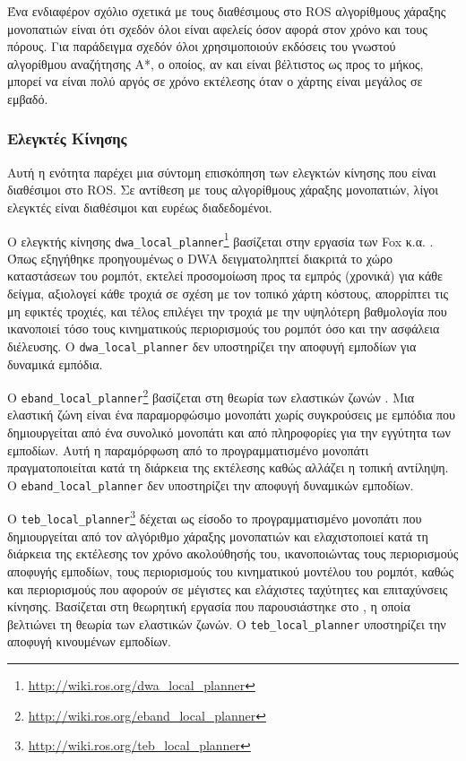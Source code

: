 Ένα ενδιαφέρον σχόλιο σχετικά με τους διαθέσιμους στο ROS αλγορίθμους
χάραξης μονοπατιών είναι ότι σχεδόν όλοι είναι αφελείς όσον αφορά στον χρόνο
και τους πόρους. Για παράδειγμα σχεδόν όλοι χρησιμοποιούν εκδόσεις του γνωστού
αλγορίθμου αναζήτησης A*, ο οποίος, αν και είναι βέλτιστος ως προς το μήκος,
μπορεί να είναι πολύ αργός σε χρόνο εκτέλεσης όταν ο χάρτης είναι μεγάλος σε
εμβαδό.

\subsubsection{Ελεγκτές Κίνησης}
\label{subsubsection:02_01_02:03_02}

Αυτή η ενότητα παρέχει μια σύντομη επισκόπηση των ελεγκτών κίνησης που είναι
διαθέσιμοι στο ROS. Σε αντίθεση με τους αλγορίθμους χάραξης μονοπατιών, λίγοι
ελεγκτές είναι διαθέσιμοι και ευρέως διαδεδομένοι.

Ο ελεγκτής κίνησης
\texttt{dwa\_local\_planner}\footnote{\url{http://wiki.ros.org/dwa\_local\_planner}}
βασίζεται στην εργασία των Fox κ.α. \cite{Fox1997}. Όπως εξηγήθηκε
προηγουμένως ο DWA δειγματοληπτεί διακριτά το χώρο καταστάσεων του ρομπότ,
εκτελεί προσομοίωση προς τα εμπρός (χρονικά) για κάθε δείγμα, αξιολογεί κάθε
τροχιά σε σχέση με τον τοπικό χάρτη κόστους, απορρίπτει τις μη εφικτές τροχιές,
και τέλος επιλέγει την τροχιά με την υψηλότερη βαθμολογία που ικανοποιεί τόσο
τους κινηματικούς περιορισμούς του ρομπότ όσο και την ασφάλεια διέλευσης. Ο
\texttt{dwa\_local\_planner} δεν υποστηρίζει την αποφυγή εμποδίων για δυναμικά
εμπόδια.

Ο
\texttt{eband\_local\_planner}\footnote{\url{http://wiki.ros.org/eband\_local\_planner}}
βασίζεται στη θεωρία των ελαστικών ζωνών \cite{Quinlan}. Μια ελαστική ζώνη
είναι ένα παραμορφώσιμο μονοπάτι χωρίς συγκρούσεις με εμπόδια που δημιουργείται
από ένα συνολικό μονοπάτι και από πληροφορίες για την εγγύτητα των εμποδίων.
Αυτή η παραμόρφωση από το προγραμματισμένο μονοπάτι πραγματοποιείται κατά τη
διάρκεια της εκτέλεσης καθώς αλλάζει η τοπική αντίληψη.  Ο
\texttt{eband\_local\_planner} δεν υποστηρίζει την αποφυγή δυναμικών εμποδίων.

Ο
\texttt{teb\_local\_planner}\footnote{\url{http://wiki.ros.org/teb\_local\_planner}}
δέχεται ως είσοδο το προγραμματισμένο μονοπάτι που δημιουργείται από τον
αλγόριθμο χάραξης μονοπατιών και ελαχιστοποιεί κατά τη διάρκεια της
εκτέλεσης τον χρόνο ακολούθησής του, ικανοποιώντας τους περιορισμούς
αποφυγής εμποδίων, τους περιορισμούς του κινηματικού μοντέλου του ρομπότ, καθώς
και περιορισμούς που αφορούν σε μέγιστες και ελάχιστες ταχύτητες και
επιταχύνσεις κίνησης.  Βασίζεται στη θεωρητική εργασία που παρουσιάστηκε στο
\cite{Rosmann2017}, η οποία βελτιώνει τη θεωρία των ελαστικών ζωνών. Ο
\texttt{teb\_local\_planner} υποστηρίζει την αποφυγή κινουμένων εμποδίων.
